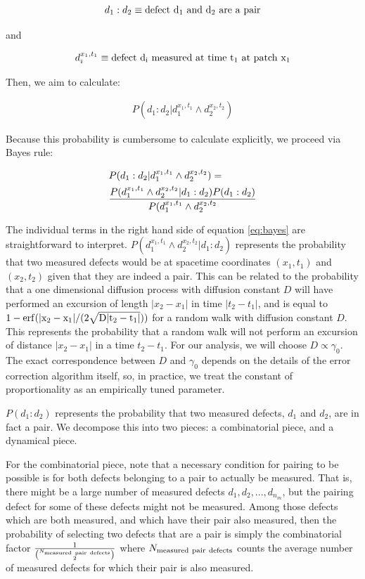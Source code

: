 \documentclass[twocolumn,superscriptaddress,aps,prb,floatfix]{revtex4-1}
\begin{document}
\begin{align}
d_1 : d_2 \equiv \rm{defect}\ d_1\ \rm{and}\ d_2\ \rm{are\ a\ pair}
\end{align}

and

\begin{align}
d_i^{x_1,t_1} \equiv \rm{defect}\ d_i\ \rm{measured\ at\ time}\ t_1\ \rm{at\ patch}\ x_1
\end{align}

Then, we aim to calculate:

\begin{align}
P(d_1:d_2 | d_1^{x_1,t_1} \wedge d_2^{x_2,t_2})
\end{align}

Because this probability is cumbersome to calculate explicitly, we proceed via Bayes rule:

\begin{align}
\label{eq:bayes}
&P(d_1:d_2 | d_1^{x_1,t_1} \wedge d_2^{x_2,t_2}) = \\ \notag
&\frac{P(d_1^{x_1,t_1} \wedge d_2^{x_2,t_2} | d_1:d_2) P(d_1 : d_2)}{P(d_1^{x_1,t_1}\wedge d_2^{x_2,t_2}}
\end{align}

The individual terms in the right hand side of equation \ref{eq:bayes} are straightforward to interpret.  $P(d_1^{x_1,t_1} \wedge d_2^{x_2,t_2} | d_1:d_2)$ represents the probability that two measured defects would be at spacetime coordinates $(x_1,t_1)$ and $(x_2,t_2)$ given that they are indeed a pair.  This can be related to the probability that a one dimensional diffusion process with diffusion constant $D$ will have performed an excursion of length $|x_2-x_1|$ in time $|t_2-t_1|$, and is equal to $1 - \rm{erf}(|x_2-x_1|/(2\sqrt{D |t_2 - t_1|}))$ for a random walk with diffusion constant $D$.  This represents the probability that a random walk will not perform an excursion of distance $|x_2-x_1|$ in a time $t_2 - t_1$.  For our analysis, we will choose $D\propto \gamma_0$.  The exact correspondence between $D$ and $\gamma_0$ depends on the details of the error correction algorithm itself, so, in practice, we treat the constant of proportionality as an empirically tuned parameter.

$P(d_1 : d_2)$ represents the probability that two measured defects, $d_1$ and $d_2$, are in fact a pair.  We decompose this into two pieces: a combinatorial piece, and a dynamical piece.

For the combinatorial piece, note that a necessary condition for pairing to be possible is for both defects belonging to a pair to actually be measured.  That is, there might be a large number of measured defects ${d_1, d_2, ..., d_{n_m}}$, but the pairing defect for some of these defects might not be measured. Among those defects which are both measured, and which have their pair also measured, then the probability of selecting two defects that are a pair is simply the combinatorial factor $\frac{1}{\binom{N_{\rm{measured\ pair\ defects}}}{2}}$ where $N_{\rm{measured\ pair\ defects}}$ counts the average number of measured defects for which their pair is also measured.
\end{document}
